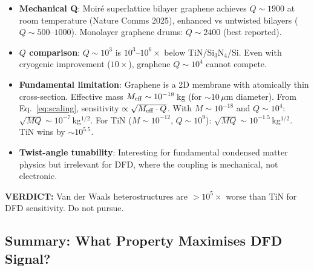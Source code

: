 \documentclass[11pt]{article}
\theoremstyle{remark}
\newcommand{\verdict}[1]{\textcolor{green!50!black}{\textbf{VERDICT:} #1}}
\begin{document}
\begin{itemize}[nosep]
  \item \textbf{Mechanical Q}: Moir\'e superlattice bilayer graphene
    achieves $Q \sim 1900$ at room temperature (Nature Comms 2025),
    enhanced vs untwisted bilayers ($Q \sim 500$--$1000$). Monolayer
    graphene drums: $Q \sim 2400$ (best reported).
  \item \textbf{$Q$ comparison}: $Q \sim 10^3$ is $10^3$--$10^6\times$
    below TiN/Si$_3$N$_4$/Si. Even with cryogenic improvement ($10\times$),
    graphene $Q \sim 10^4$ cannot compete.
  \item \textbf{Fundamental limitation}: Graphene is a 2D membrane
    with atomically thin cross-section. Effective mass $M_{\rm eff}
    \sim 10^{-18}$\,kg (for $\sim 10\,\mu$m diameter). From
    Eq.~\eqref{eq:scaling}, sensitivity $\propto \sqrt{M_{\rm eff}
    \cdot Q}$. With $M \sim 10^{-18}$ and $Q \sim 10^4$:
    $\sqrt{MQ} \sim 10^{-7}$\,kg$^{1/2}$. For TiN ($M \sim 10^{-12}$,
    $Q \sim 10^9$): $\sqrt{MQ} \sim 10^{-1.5}$\,kg$^{1/2}$. TiN
    wins by $\sim 10^{5.5}$.
  \item \textbf{Twist-angle tunability}: Interesting for fundamental
    condensed matter physics but irrelevant for DFD, where the
    coupling is mechanical, not electronic.
\end{itemize}

\verdict{Van der Waals heterostructures are $> 10^5\times$ worse than
TiN for DFD sensitivity. Do not pursue.}

\subsection{Summary: What Property Maximises DFD Signal?}
\end{document}
